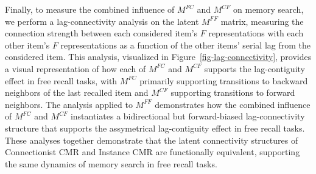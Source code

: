 \documentclass[
  letterpaper,
  11pt,
  english,
  singlespacing,
  headsepline]{MastersDoctoralThesis}
\begin{document}
Finally, to measure the combined influence of \(M^{FC}\) and \(M^{CF}\)
on memory search, we perform a lag-connectivity analysis on the latent
\(M^{FF}\) matrix, measuring the connection strength between each
considered item's \(F\) representations with each other item's \(F\)
representations as a function of the other items' serial lag from the
considered item. This analysis, visualized in
Figure~\ref{fig-lag-connectivity}, provides a visual representation of
how each of \(M^{FC}\) and \(M^{CF}\) supports the lag-contiguity effect
in free recall tasks, with \(M^{FC}\) primarily supporting transitions
to backward neighbors of the last recalled item and \(M^{CF}\)
supporting transitions to forward neighbors. The analysis applied to
\(M^{FF}\) demonstrates how the combined influence of \(M^{FC}\) and
\(M^{CF}\) instantiates a bidirectional but forward-biased
lag-connectivity structure that supports the assymetrical lag-contiguity
effect in free recall tasks. These analyses together demonstrate that
the latent connectivity structures of Connectionist CMR and Instance CMR
are functionally equivalent, supporting the same dynamics of memory
search in free recall tasks.
\end{document}
